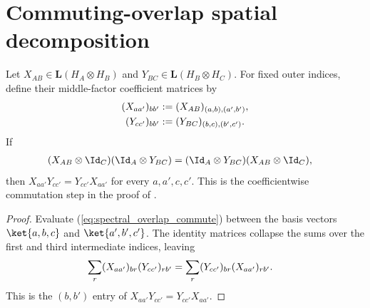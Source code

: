 \section{Commuting-overlap spatial decomposition}

\begin{theorem}%
    \label{thm:commuting_overlapping_middle_coefficients}
    \leanok
    Let $X_{AB}\in\mathbf L(H_A\otimes H_B)$ and
    $Y_{BC}\in\mathbf L(H_B\otimes H_C)$. For fixed outer indices, define
    their middle-factor coefficient matrices by
    \begin{align}
        (X_{aa'})_{bb'}
         & :=(X_{AB})_{(a,b),(a',b')}, \notag \\
        (Y_{cc'})_{bb'}
         & :=(Y_{BC})_{(b,c),(b',c')}.
        \notag
    \end{align}
    If
    \begin{align}
        (X_{AB}\otimes\Id_C)(\Id_A\otimes Y_{BC})
         & =(\Id_A\otimes Y_{BC})(X_{AB}\otimes\Id_C),
        \label{eq:spectral_overlap_commute}
    \end{align}
    then $X_{aa'}Y_{cc'}=Y_{cc'}X_{aa'}$ for every $a,a',c,c'$. This is
    the coefficientwise commutation step in the proof of
    \cite[Lemma~2.1]{Beigi2012Classification}.
\end{theorem}

\begin{proof}
    \leanok
    Evaluate (\ref{eq:spectral_overlap_commute}) between the basis vectors
    $\ket{a,b,c}$ and $\ket{a',b',c'}$. The identity matrices collapse the
    sums over the first and third intermediate indices, leaving
    \begin{align}
        \sum_r(X_{aa'})_{br}(Y_{cc'})_{rb'}
         & =\sum_r(Y_{cc'})_{br}(X_{aa'})_{rb'}.
        \notag
    \end{align}
    This is the $(b,b')$ entry of
    $X_{aa'}Y_{cc'}=Y_{cc'}X_{aa'}$.
\end{proof}


